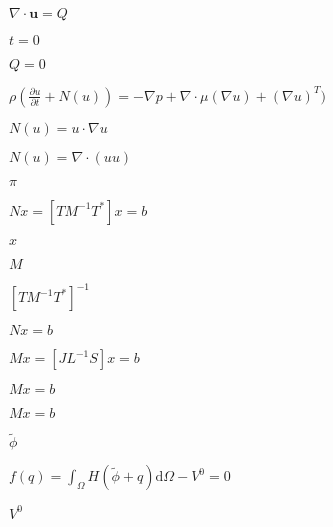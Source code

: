 \documentclass{article}
\begin{document}
$ \nabla \cdot \mathbf{u} = Q $
\pagebreak

$ t = 0 $
\pagebreak

$ Q = 0 $
\pagebreak

$\rho(\frac{\partial u}{\partial t} + N(u)) = -\nabla p + \nabla \cdot \mu (\nabla u) + (\nabla u)^T )$
\pagebreak

$ N(u) = u \cdot \nabla u $
\pagebreak

$ N(u) = \nabla \cdot (u u) $
\pagebreak

$ \pi $
\pagebreak

$ Nx = [T M^{-1} T^{*}]x = b $
\pagebreak

$ x $
\pagebreak

$ M $
\pagebreak

$ [T M^{-1} T^{*}]^{-1} $
\pagebreak

$ Nx = b $
\pagebreak

$ Mx = [J L^{-1} S]x = b $
\pagebreak

$ Mx=b $
\pagebreak

$ Mx = b $
\pagebreak

$ \tilde{\phi} $
\pagebreak

$ f(q) = \int_{\Omega} H(\tilde{\phi} + q) \text{d}\Omega - V^0 = 0 $
\pagebreak

$ V^0 $
\pagebreak
\end{document}

